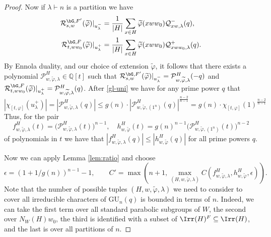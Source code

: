 \documentclass[eqthmnum,nocolour,skinny]{jt-calcs}
\newcommand{\GU}{\ensuremath{\mathrm{GU}}}
\begin{document}
\begin{proof}
Now if $\lambda\vdash n$ is a partition we have
\begin{align*}
\mathcal{R}_{s,w}^{\bG,F'}(\widetilde{\varphi})|_{u_{\lambda}^-} &= \frac{1}{|H|}\sum_{x \in H}\widetilde{\varphi}(xww_0)\mathcal{Q}_{xw,\lambda}^-(q),\\
\mathcal{R}_{t,ww_0}^{\bG,F}(\widetilde{\varphi})|_{u_{\lambda}^+} &= \frac{1}{|H|}\sum_{x \in H}\widetilde{\varphi}(xww_0)\mathcal{Q}_{xww_0,\lambda}^+(q).
%
\end{align*}
By Ennola duality, and our choice of extension $\widetilde{\varphi}$, it follows that there exists a polynomial $\mathcal{P}_{w,\widetilde{\varphi},\lambda}^H \in \mathbb{Q}[t]$ such that $\mathcal{R}_{s,w}^{\bG,F'}(\widetilde{\varphi})|_{u_{\lambda}^-} = \mathcal{P}_{w,\widetilde{\varphi},\lambda}^H(-q)$ and $\mathcal{R}_{t,ww_0}^{\bG,F}(\widetilde{\varphi})|_{u_{\lambda}^+} = \mathcal{P}_{w,\widetilde{\varphi},\lambda}^H(q)$. After \cref{gl-uni} we have for any prime power $q$ that
\begin{equation*}
|\chi_{[t,\varphi]}(u_{\lambda}^+)| = |\mathcal{P}_{w,\widetilde{\varphi},\lambda}^H(q)| \leqslant g(n)\cdot |\mathcal{P}_{w,\widetilde{\varphi},(1^n)}^H(q)|^{\frac{n-2}{n-1}} = g(n) \cdot \chi_{[t,\varphi]}(1)^{\frac{n-2}{n-1}}
\end{equation*}
Thus, for the pair
\begin{equation*}
f_{w,\widetilde{\varphi},\lambda}^H(t) = \bigl(\mathcal{P}_{w,\widetilde{\varphi},\lambda}^H(t)\bigr)^{n-1}, \quad
    h_{w,\widetilde{\varphi}}^H(t) = g(n)^{n-1}\bigl(\mathcal{P}_{w,\widetilde{\varphi},(1^n)}^H(t)\bigr)^{n-2}
\end{equation*}
of polynomials in $t$ we have that $|f_{w,\widetilde{\varphi},\lambda}^H(q)| \leq |h_{w,\widetilde{\varphi}}^H(q)|$ for all prime powers $q$.


Now we can apply Lemma \ref{lem:ratio} and choose
\begin{equation*}
\epsilon = (1+1/g(n))^{n-1}-1, \qquad C' = \max\left(n+1,\max_{(H,w,\widetilde{\varphi},\lambda)}C(f_{w,\widetilde{\varphi},\lambda}^H,h_{w,\widetilde{\varphi}}^H,\epsilon)\right).
\end{equation*}
Note that the number of possible tuples $(H,w,\widetilde{\varphi},\lambda)$ we need to consider to cover all irreducible characters of $\GU_n(q)$ is bounded in terms of $n$. Indeed, we can take the first term over all standard parabolic subgroups of $W$, the second over $N_W(H)w_0$, the third is identified with a subset of $\Irr(H)^F \subseteq \Irr(H)$, and the last is over all partitions of $n$.


\end{proof}
\end{document}
